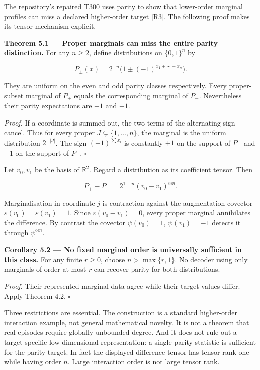 \documentclass[11pt,a4paper]{article}
\begin{document}
The repository's repaired T300 uses parity to show that lower-order
marginal profiles can miss a declared higher-order target {[}R3{]}. The
following proof makes its tensor mechanism explicit.


\textbf{Theorem 5.1 --- Proper marginals can miss the entire parity
distinction.} For any \(n\geq2\), define distributions on \(\{0,1\}^n\)
by

\nopagebreak[4]

\[
P_\pm(x)=2^{-n}\bigl(1\pm(-1)^{x_1+\cdots+x_n}\bigr).
\]

They are uniform on the even and odd parity classes respectively. Every
proper-subset marginal of \(P_+\) equals the corresponding marginal of
\(P_-\). Nevertheless their parity expectations are \(+1\) and \(-1\).

\emph{Proof.} If a coordinate is summed out, the two terms of the
alternating sign cancel. Thus for every proper
\(J\subsetneq\{1,\ldots,n\}\), the marginal is the uniform distribution
\(2^{-|J|}\). The sign \((-1)^{\sum x_i}\) is constantly \(+1\) on the
support of \(P_+\) and \(-1\) on the support of \(P_-\). \(\square\)

Let \(v_0,v_1\) be the basis of \(\mathbb R^2\). Regard a distribution
as its coefficient tensor. Then

\nopagebreak[4]

\[
P_+-P_-=2^{1-n}(v_0-v_1)^{\otimes n}.
\]

Marginalisation in coordinate \(j\) is contraction against the
augmentation covector \(\varepsilon(v_0)=\varepsilon(v_1)=1\). Since
\(\varepsilon(v_0-v_1)=0\), every proper marginal annihilates the
difference. By contrast the covector \(\psi(v_0)=1\), \(\psi(v_1)=-1\)
detects it through \(\psi^{\otimes n}\).


\textbf{Corollary 5.2 --- No fixed marginal order is universally
sufficient in this class.} For any finite \(r\geq0\), choose
\(n>\max\{r,1\}\). No decoder using only marginals of order at most
\(r\) can recover parity for both distributions.

\emph{Proof.} Their represented marginal data agree while their target
values differ. Apply Theorem 4.2. \(\square\)

Three restrictions are essential. The construction is a standard
higher-order interaction example, not general mathematical novelty. It
is not a theorem that real episodes require globally unbounded degree.
And it does not rule out a target-specific low-dimensional
representation: a single parity statistic is sufficient for the parity
target. In fact the displayed difference tensor has tensor rank one
while having order \(n\). Large interaction order is not large tensor
rank.
\end{document}
